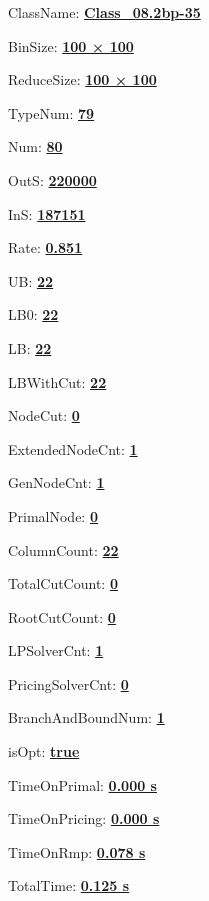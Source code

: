 \documentclass[11pt]{article}
\begin{document}
\pagestyle{empty}


ClassName: \underline{\textbf{Class_08.2bp-35}}
\par
BinSize: \underline{\textbf{100 × 100}}
\par
ReduceSize: \underline{\textbf{100 × 100}}
\par
TypeNum: \underline{\textbf{79}}
\par
Num: \underline{\textbf{80}}
\par
OutS: \underline{\textbf{220000}}
\par
InS: \underline{\textbf{187151}}
\par
Rate: \underline{\textbf{0.851}}
\par
UB: \underline{\textbf{22}}
\par
LB0: \underline{\textbf{22}}
\par
LB: \underline{\textbf{22}}
\par
LBWithCut: \underline{\textbf{22}}
\par
NodeCut: \underline{\textbf{0}}
\par
ExtendedNodeCnt: \underline{\textbf{1}}
\par
GenNodeCnt: \underline{\textbf{1}}
\par
PrimalNode: \underline{\textbf{0}}
\par
ColumnCount: \underline{\textbf{22}}
\par
TotalCutCount: \underline{\textbf{0}}
\par
RootCutCount: \underline{\textbf{0}}
\par
LPSolverCnt: \underline{\textbf{1}}
\par
PricingSolverCnt: \underline{\textbf{0}}
\par
BranchAndBoundNum: \underline{\textbf{1}}
\par
isOpt: \underline{\textbf{true}}
\par
TimeOnPrimal: \underline{\textbf{0.000 s}}
\par
TimeOnPricing: \underline{\textbf{0.000 s}}
\par
TimeOnRmp: \underline{\textbf{0.078 s}}
\par
TotalTime: \underline{\textbf{0.125 s}}
\par
\newpage


\end{document}
